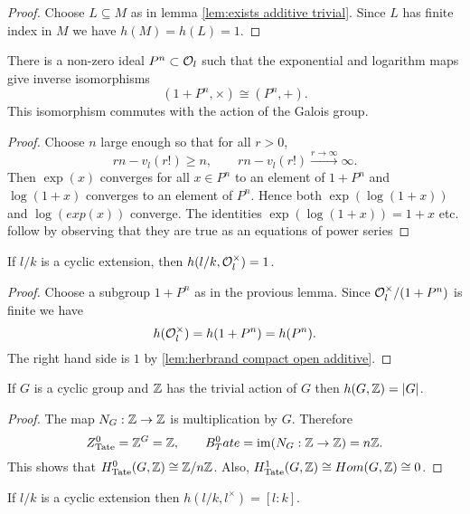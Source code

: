 \begin{proof}
	Choose $L \subseteq M$ as in lemma \ref{lem:exists additive trivial}.
	Since $L$ has finite index in $M$ we have $h(M) = h(L) = 1$.
\end{proof}


\begin{lemma}\label{lem:local isomorphism}
	There is a non-zero ideal $P^n \subset {\mathcal O}_l$ such that the
	exponential and logarithm maps give inverse isomorphisms
	\[
		(1 + P^n, \times) \cong (P^n,+).
	\]
	This isomorphism commutes with the action of the Galois group.
\end{lemma}

\begin{proof}
	Choose $n$ large enough so that for all $r > 0$,
	\[
		rn - v_l(r!) \ge n, \qquad
		rn - v_l(r!) \stackrel{r \to \infty}\to \infty.
	\]
	Then $\exp(x)$ converges for all $x \in P^n$ to an element of $1 + P^n$ and
	$\log(1+x)$ converges to an element of $P^n$.
	Hence both $\exp(\log(1+x))$ and $\log(exp(x))$ converge.
	The identities $\exp(\log(1+x))=1+x$ etc. follow by observing that they are true as
	an equations of power series
\end{proof}


\begin{lemma}\label{lem:herbrand local units}
	If $l/k$ is a cyclic extension, then $h(l/k, {\mathcal O}_l^\times) = 1$.
\end{lemma}

\begin{proof}
	Choose a subgroup $1+P^n$ as in the provious lemma.
	Since ${\mathcal O}_l^\times / (1+P^n)$ is finite we have
	\[
		h({\mathcal O}_l^\times) = h(1+P^n) = h(P^n).
	\]
	The right hand side is $1$ by \ref{lem:herbrand compact open additive}.
\end{proof}

\begin{lemma} \label{lem:herbrand Z}
	If $G$ is a cyclic group and ${\mathbb Z}$ has the trivial action of $G$ then $h(G,{\mathbb Z}) = |G|$.
\end{lemma}

\begin{proof}
	The map	$N_G : {\mathbb Z} \to {\mathbb Z}$ is multiplication by $G$.
	Therefore
	\[
		Z^0_{\mathrm{Tate}} = {\mathbb Z}^G = {\mathbb Z}, \qquad
		B^0_Tate = \mathrm{im}(N_G : {\mathbb Z} \to {\mathbb Z}) = n{\mathbb Z}.
	\]
	This shows that $H^0_{\mathrm{Tate}}(G,{\mathbb Z})\cong {\mathbb Z} / n{\mathbb Z}$.
	Also,	$H^1_{\mathrm{Tate}}(G,{\mathbb Z}) \cong Hom(G,{\mathbb Z}) \cong 0$.
\end{proof}

\begin{lemma} \label{lem:herbrand local l*}
	If $l/k$ is a cyclic extension then $h(l/k, l^\times)= [l:k]$.
\end{lemma}


